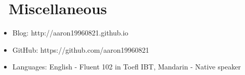 \documentclass{resume}
\begin{document}
\section{\faInfo\ Miscellaneous}
\begin{itemize}[parsep=0.5ex]
  \item Blog: http://aaron19960821.github.io
  \item GitHub: https://github.com/aaron19960821
  \item Languages: English - Fluent 102 in Toefl IBT, Mandarin - Native speaker
\end{itemize}
\end{document}
